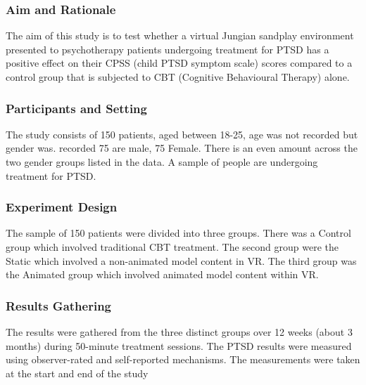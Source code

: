 \documentclass[
]{article}
\begin{document}
\hypertarget{aim-and-rationale}{%
\subsubsection{\texorpdfstring{\textbf{Aim and
Rationale}}{Aim and Rationale}}\label{aim-and-rationale}}

The aim of this study is to test whether a virtual Jungian sandplay
environment presented to psychotherapy patients undergoing treatment for
PTSD has a positive effect on their CPSS (child PTSD symptom scale)
scores compared to a control group that is subjected to CBT (Cognitive
Behavioural Therapy) alone.

\hypertarget{participants-and-setting}{%
\subsubsection{\texorpdfstring{\textbf{Participants and
Setting}}{Participants and Setting}}\label{participants-and-setting}}

The study consists of 150 patients, aged between 18-25, age was not
recorded but gender was. recorded 75 are male, 75 Female. There is an
even amount across the two gender groups listed in the data. A sample of
people are undergoing treatment for PTSD.

\hypertarget{experiment-design}{%
\subsubsection{\texorpdfstring{\textbf{Experiment
Design}}{Experiment Design}}\label{experiment-design}}

The sample of 150 patients were divided into three groups. There was a
Control group which involved traditional CBT treatment. The second group
were the Static which involved a non-animated model content in VR. The
third group was the Animated group which involved animated model content
within VR.

\hypertarget{results-gathering}{%
\subsubsection{\texorpdfstring{\textbf{Results
Gathering}}{Results Gathering}}\label{results-gathering}}

The results were gathered from the three distinct groups over 12 weeks
(about 3 months) during 50-minute treatment sessions. The PTSD results
were measured using observer-rated and self-reported mechanisms. The
measurements were taken at the start and end of the study
\end{document}
